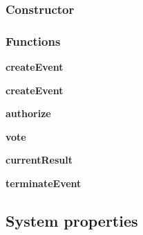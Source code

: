 \subsubsection{Constructor}

\subsubsection{Functions}

\begin{list}{}{}
\item \textbf{createEvent}
\end{list}

\begin{list}{}{}
\item \textbf{createEvent}
\item \textbf{authorize}
\item \textbf{vote}
\item \textbf{currentResult}
\item \textbf{terminateEvent}
\end{list}

\subsection{System properties}
